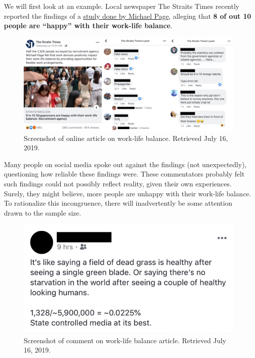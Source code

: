 \documentclass[
  openany]{book}
\begin{document}
We will first look at an example. Local newspaper The Straits Times recently reported the findings of a \href{https://www.michaelpage.com.sg/advice/career-advice/work-life-balance/singapore-happy-work}{study done by Michael Page}, alleging that \textbf{8 of out 10 people are ``happy'' with their work-life balance}.

\begin{figure}

{\centering \includegraphics[width=0.9\linewidth]{images/samples/st_worklife} 

}

\caption{Screenshot of online article on work-life balance. Retrieved July 16, 2019.}\label{fig:st-worklife}
\end{figure}

Many people on social media spoke out against the findings (not unexpectedly), questioning how reliable these findings were. These commentators probably felt such findings could not possibly reflect reality, given their own experiences. Surely, they might believe, more people are unhappy with their work-life balance. To rationalize this incongruence, there will inadvertently be some attention drawn to the sample size.

\begin{figure}

{\centering \includegraphics[width=0.6\linewidth]{images/samples/st_samplesize} 

}

\caption{Screenshot of comment on work-life balance article. Retrieved July 16, 2019.}\label{fig:st-samplesize}
\end{figure}
\end{document}
